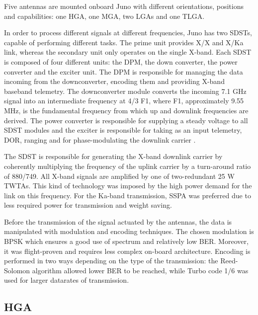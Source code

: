 Five antennas are mounted onboard Juno with different orientations, positions and capabilities: one HGA, one MGA, two LGAs and one TLGA. 

In order to process different signals at different frequencies, Juno has two SDSTs, capable of performing different tasks. The prime unit provides X/X and X/Ka link, whereas the secondary unit only operates on the single X-band. Each SDST is composed of four different units: the DPM, the down converter, the power converter and the exciter unit. 
The DPM is responsible for managing the data incoming from the downconverter, encoding them and providing X-band baseband telemetry. The downconverter module converts the incoming 7.1 GHz signal into an intermediate frequency at 4/3 F1, where F1, approximately 9.55 MHz, is the fundamental frequency from which up and downlink frequencies are derived. The power converter is responsible for supplying a steady voltage to all SDST modules and the exciter is responsible for taking as an input telemetry, DOR, ranging and for phase-modulating the downlink carrier \cite{juno_telecommunication}\cite{ka_uplink}. 

The SDST is responsible for generating the X-band downlink carrier by coherently multiplying the frequency of the uplink carrier by a turn-around ratio of 880/749. All X-band signals are amplified by one of two-redundant 25 W TWTAs\cite{juno_telecommunication}. This kind of technology was imposed by the high power demand for the link on this frequency. For the Ka-band transmission, SSPA was preferred due to less required power for transmission and weight saving.

Before the transmission of the signal actuated by the antennas, the data is manipulated with modulation and encoding techniques. The chosen modulation is BPSK which ensures a good use of spectrum and relatively low BER. Moreover, it was flight-proven and requires less complex on-board architecture.
Encoding is performed in two ways depending on the type of the transmission: the Reed-Solomon algorithm allowed lower BER to be reached, while Turbo code 1/6 was used for larger datarates of transmission. 

\subsection{HGA}
\label{subsec:hga}


